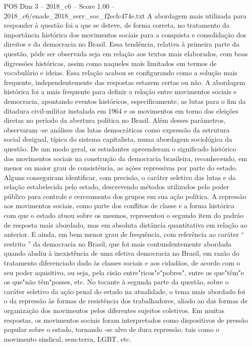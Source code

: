 \begin{textsample}{POS Dim 3 – 2018\_c6 – Score 1.00 – 2018\_c6/enade\_2018\_serv\_soc\_f2ecfc474e.txt}
A abordagem mais utilizada para responder à questão foi a que se deteve, de forma correta, no tratamento da importância histórica dos movimentos sociais para a conquista e consolidação dos direitos e da democracia no Brasil.
Essa tendência, relativa à primeira parte da questão, pôde ser observada seja em relação aos textos mais elaborados, com boas digressões históricas, assim como naqueles mais limitados em termos de vocabulário e ideias.
Essa relação acabou se configurando como a solução mais frequente, independentemente das respostas estarem certas ou não.
A abordagem histórica foi a mais frequente para definir a relação entre movimentos sociais e democracia, apontando eventos históricos, especificamente, as lutas para o fim da ditadura civil-militar instalada em 1964 e os movimentos em torno das eleições diretas no período da abertura política no Brasil.
Além desses parâmetros, observaram -se análises das lutas democráticas como expressão da estrutura social desigual, típica do sistema capitalista, numa abordagem sociológica da questão.
De um modo geral, os estudantes apreenderam o significado histórico dos movimentos sociais na construção da democracia brasileira, reconhecendo, em menor ou maior grau de consistência, as ações repressivas por parte do estado.
Alguns conseguiram identificar, com precisão, o caráter seletivo das lutas e da relação estabelecida pelo estado, descrevendo métodos utilizados pelo poder público para controle e cerceamento dos grupos em sua ação política.
A repressão aos movimentos sociais, como parte dos conflitos de classe e a forma histórica com que o estado atuou sobre os mesmos, representou o segundo item do padrão de resposta mais abordado, mas em absoluta distância quantitativa em relação ao anterior.
E ainda, em bem menor grau de frequência, com referência ao caráter “ restrito ” da democracia no Brasil, que foi mais contundentemente abordada quando aludiu à inexistência de uma efetiva democracia no Brasil, em razão do tratamento diferenciado dado às classes sociais e aos cidadãos, de acordo com o seu poder aquisitivo, ou seja, pela cisão entre"ricos"e"pobres", entre os que"têm"e os que"não têm"posses, etc.
No tocante à segunda parte da questão, sobre o caráter seletivo da ação penal do estado na atualidade, o tema mais abordado foi o da repressão às formas de resistência dos trabalhadores, aliado ao das formas de organização dos movimentos pelos diferentes sujeitos coletivos.
Em muitas respostas, os movimentos sociais foram interpretados como dispositivos de pressão popular sobre o estado, tornando -se alvo de dura repressão, tais como o movimento sindical, sem-terra, LGBT, etc.

\end{textsample}
